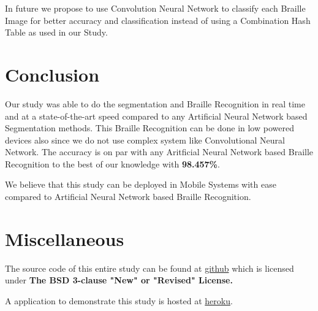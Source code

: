 \documentclass{article}
\begin{document}
In future we propose to use Convolution Neural Network to classify each Braille Image for better accuracy and classification instead of using a Combination Hash Table as used in our Study.


\section{Conclusion}

Our study was able to do the segmentation and Braille Recognition in real time and at a state-of-the-art speed compared to any Artificial Neural Network based Segmentation methods. This Braille Recognition can be done in low powered devices also since we do not use complex system like Convolutional Neural Network. The accuracy is on par with any Aritficial Neural Network based Braille Recognition to the best of our knowledge with \textbf{98.457\%}.

We believe that this study can be deployed in Mobile Systems with ease compared to Artificial Neural Network based Braille Recognition.



\section{Miscellaneous}

The source code of this entire study can be found at \href{https://github.com/antony-jr/OpticalBrailleRecognition}{github} which is licensed under \textbf{The BSD 3-clause "New" or "Revised" License.}



A application to demonstrate this study is hosted at \href{https://opticalbraillerecognition-demo.herokuapp.com/}{heroku}.
\end{document}
